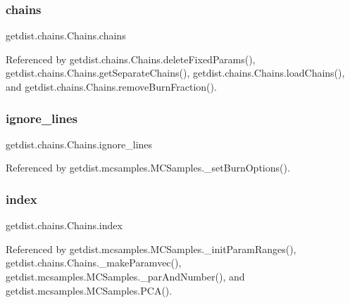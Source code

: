 \subsubsection{\texorpdfstring{chains}{chains}}
{\footnotesize\ttfamily getdist.\+chains.\+Chains.\+chains}



Referenced by getdist.\+chains.\+Chains.\+delete\+Fixed\+Params(), getdist.\+chains.\+Chains.\+get\+Separate\+Chains(), getdist.\+chains.\+Chains.\+load\+Chains(), and getdist.\+chains.\+Chains.\+remove\+Burn\+Fraction().

\mbox{\label{classgetdist_1_1chains_1_1Chains_a323e8881d193a20848436d300273d421}} 
\subsubsection{\texorpdfstring{ignore\+\_\+lines}{ignore\_lines}}
{\footnotesize\ttfamily getdist.\+chains.\+Chains.\+ignore\+\_\+lines}



Referenced by getdist.\+mcsamples.\+M\+C\+Samples.\+\_\+set\+Burn\+Options().

\mbox{\label{classgetdist_1_1chains_1_1Chains_a0f9fc3c48f94d1ad9977e7028b27f451}} 
\subsubsection{\texorpdfstring{index}{index}}
{\footnotesize\ttfamily getdist.\+chains.\+Chains.\+index}



Referenced by getdist.\+mcsamples.\+M\+C\+Samples.\+\_\+init\+Param\+Ranges(), getdist.\+chains.\+Chains.\+\_\+make\+Paramvec(), getdist.\+mcsamples.\+M\+C\+Samples.\+\_\+par\+And\+Number(), and getdist.\+mcsamples.\+M\+C\+Samples.\+P\+C\+A().

\mbox{\label{classgetdist_1_1chains_1_1Chains_a0437ab45f665cbdd53ae01c4b91fd797}} 
